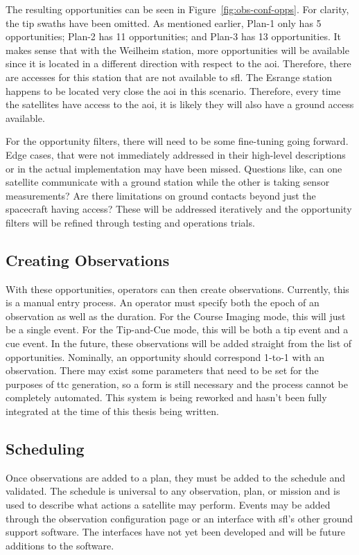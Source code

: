 The resulting opportunities can be seen in Figure~\ref{fig:obs-conf-opps}.  For
clarity, the tip swaths have been omitted. As mentioned earlier, Plan-1 only
has 5 opportunities; Plan-2 has 11 opportunities; and Plan-3 has 13
opportunities. It makes sense that with the Weilheim station, more
opportunities will be available since it is located in a different direction
with respect to the \gls{aoi}. Therefore, there are accesses for this station
that are not available to \gls{sfl}. The Esrange station happens to be located
very close the \gls{aoi} in this scenario. Therefore, every time the satellites
have access to the \gls{aoi}, it is likely they will also have a ground access
available. 


For the opportunity filters, there will need to be some fine-tuning going
forward. Edge cases, that were not immediately addressed in their high-level
descriptions or in the actual implementation may have been missed. Questions
like, can one satellite communicate with a ground station while the other is
taking sensor measurements? Are there limitations on ground contacts beyond
just the spacecraft having access? These will be addressed iteratively and the
opportunity filters will be refined through testing and operations
trials.

\subsection{Creating Observations}

With these opportunities, operators can then create observations. Currently,
this is a manual entry process. An operator must specify both the epoch of an
observation as well as the duration. For the Course Imaging mode, this will
just be a single event. For the Tip-and-Cue mode, this will be both a tip event
and a cue event. In the future, these observations will be added straight from
the list of opportunities. Nominally, an opportunity should correspond 1-to-1
with an observation. There may exist some parameters that need to be set for
the purposes of \gls{ttc} generation, so a form is still necessary and the
process cannot be completely automated. This system is being reworked and
hasn't been fully integrated at the time of this thesis being written.


\subsection{Scheduling}


Once observations are added to a plan, they must be added to the schedule and
validated. The schedule is universal to any observation, plan, or mission and
is used to describe what actions a satellite may perform. Events may be added
through the observation configuration page or an interface with \gls{sfl}’s
other ground support software. The interfaces have not yet been developed and
will be future additions to the software.

